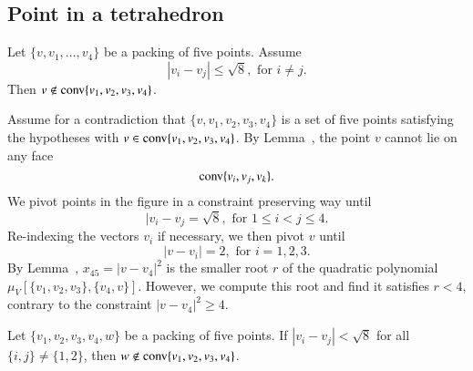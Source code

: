 \begin{tarskidata}
\begin{tarski}
\section{Point in a tetrahedron}

\begin{lemma} 
Let $\{v,v_1,\ldots,v_4\}$ be a packing of five points.  Assume
	$$ |v_i-v_j| \le \sqrt8, \text{ for } i\ne j.$$
Then $v\not\in {\operatorname{conv}}\{v_1,v_2,v_3,v_4\}$.
\end{lemma}


\begin{proved}  Assume for a contradiction that $\{v,v_1,v_2,v_3,v_4\}$ is a set
of five points satisfying the hypotheses with $v\in{\operatorname{conv}}\{v_1,v_2,v_3,v_4\}$.
By Lemma~, the point $v$ cannot lie on any face
	$${\operatorname{conv}}\{v_i,v_j,v_k\}.$$
We pivot points in the figure in a constraint preserving way until 
	$$
	|v_i-v_j = \sqrt8,\text{ for } 1 \le i < j \le 4.
	$$
Re-indexing the vectors $v_i$ if necessary, we then pivot $v$ until
	$$
	|v-v_i| = 2, \text{ for } i=1,2,3.
	$$
By Lemma~, $x_{45}=|v-v_4|^2$ is the smaller root $r$ of the quadratic
polynomial
	$\mu_V[\{v_1,v_2,v_3\},\{v_4,v\}]$.
However, we compute this root and find it satisfies $r < 4$, contrary to the
constraint $|v-v_4|^2 \ge 4$.
\swallowed\end{proved}
\end{tarski}

\begin{tarski}

\begin{lemma} %
Let $\{v_1,v_2,v_3,v_4,w\}$ be a packing of five points.  If
$|v_i-v_j|<\sqrt8$ for all $\{i,j\}\ne\{1,2\}$, then $w\not\in{\operatorname{conv}}\{v_1,v_2,v_3,v_4\}$.
\end{lemma}


\end{tarski}
\end{tarskidata}
